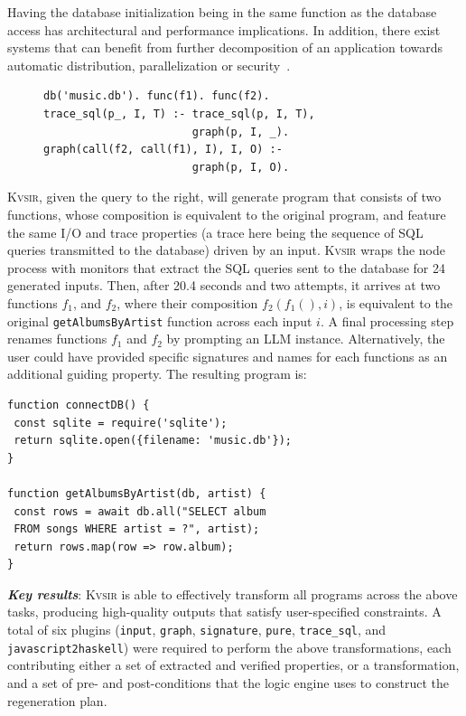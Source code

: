 \documentclass[nonacm,sigplan,review]{acmart}
\newcommand{\sys}{{\scshape Kv{\textalpha}sir}\xspace}
\newcommand{\heading}[1]{\vspace{2pt}\noindent\textbf{\emph{#1}}:\enspace}
\newcommand{\ttt}[1]{\texttt{#1}\xspace}
\begin{document}
Having the database initialization being in the same function as 
the database access has architectural and performance implications.
In addition, there exist systems that can benefit from further decomposition
of an application towards automatic distribution, parallelization or security~\cite{Towards_Modern_Ghemaw_2023, vasilakis2019ignis, vasilakis2018breakapp}.
\begin{figure}
  \begin{verbatim}
db('music.db'). func(f1). func(f2).
trace_sql(p_, I, T) :- trace_sql(p, I, T),
                       graph(p, I, _).
graph(call(f2, call(f1), I), I, O) :-
                       graph(p, I, O).
\end{verbatim}
\end{figure}
\sys, given the query to the right, will 
generate program that consists of two functions,
whose composition is equivalent to the original program, and feature 
the same I/O and trace properties (a trace here being the sequence of SQL 
queries transmitted to the database) driven by an input.
\sys wraps the node process with monitors that extract the SQL queries 
sent to the database for 24 generated inputs.
Then, after 20.4 seconds and two attempts, it arrives at two functions $f_1$, and 
$f_2$, where their composition $f_2(f_1(), i)$,
is equivalent to the original \ttt{getAlbumsByArtist} function across each input $i$.
A final processing step renames functions $f_1$ and $f_2$ by prompting an LLM instance.
Alternatively, the user could have provided specific signatures and names for each 
functions as an additional guiding property.
The resulting program is:
\begin{verbatim}
function connectDB() {
 const sqlite = require('sqlite');
 return sqlite.open({filename: 'music.db'});
}

function getAlbumsByArtist(db, artist) {
 const rows = await db.all("SELECT album
 FROM songs WHERE artist = ?", artist);
 return rows.map(row => row.album); 
}
\end{verbatim}

\heading{Key results}
\sys is able to effectively transform all programs across the above tasks,
producing high-quality outputs that satisfy user-specified constraints.
A total
of six plugins (\ttt{input}, \ttt{graph}, \ttt{signature}, \ttt{pure}, \ttt{trace\_sql}, and \ttt{javascript2haskell})
were required to perform the above transformations, each
contributing either a set of extracted and verified properties, or a
transformation, and a set of pre- and post-conditions that the logic engine
uses to construct the regeneration plan.
\end{document}
